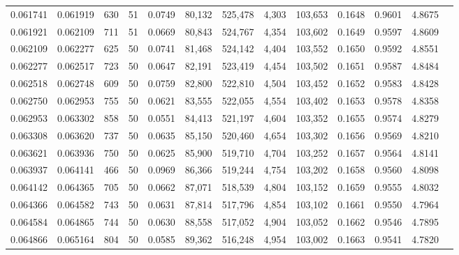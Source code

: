 \begin{tabular}{rrrrrrrrrrrrr}
0.061741 & 0.061919 &   630 &  51 &                                     0.0749 &  80,132 & 525,478 &   4,303 & 103,653 & 0.1648 & 0.9601 & 4.8675 \\
0.061921 & 0.062109 &   711 &  51 &                                     0.0669 &  80,843 & 524,767 &   4,354 & 103,602 & 0.1649 & 0.9597 & 4.8609 \\
0.062109 & 0.062277 &   625 &  50 &                                     0.0741 &  81,468 & 524,142 &   4,404 & 103,552 & 0.1650 & 0.9592 & 4.8551 \\
0.062277 & 0.062517 &   723 &  50 &                                     0.0647 &  82,191 & 523,419 &   4,454 & 103,502 & 0.1651 & 0.9587 & 4.8484 \\
0.062518 & 0.062748 &   609 &  50 &                                     0.0759 &  82,800 & 522,810 &   4,504 & 103,452 & 0.1652 & 0.9583 & 4.8428 \\
0.062750 & 0.062953 &   755 &  50 &                                     0.0621 &  83,555 & 522,055 &   4,554 & 103,402 & 0.1653 & 0.9578 & 4.8358 \\
0.062953 & 0.063302 &   858 &  50 &                                     0.0551 &  84,413 & 521,197 &   4,604 & 103,352 & 0.1655 & 0.9574 & 4.8279 \\
0.063308 & 0.063620 &   737 &  50 &                                     0.0635 &  85,150 & 520,460 &   4,654 & 103,302 & 0.1656 & 0.9569 & 4.8210 \\
0.063621 & 0.063936 &   750 &  50 &                                     0.0625 &  85,900 & 519,710 &   4,704 & 103,252 & 0.1657 & 0.9564 & 4.8141 \\
0.063937 & 0.064141 &   466 &  50 &                                     0.0969 &  86,366 & 519,244 &   4,754 & 103,202 & 0.1658 & 0.9560 & 4.8098 \\
0.064142 & 0.064365 &   705 &  50 &                                     0.0662 &  87,071 & 518,539 &   4,804 & 103,152 & 0.1659 & 0.9555 & 4.8032 \\
0.064366 & 0.064582 &   743 &  50 &                                     0.0631 &  87,814 & 517,796 &   4,854 & 103,102 & 0.1661 & 0.9550 & 4.7964 \\
0.064584 & 0.064865 &   744 &  50 &                                     0.0630 &  88,558 & 517,052 &   4,904 & 103,052 & 0.1662 & 0.9546 & 4.7895 \\
0.064866 & 0.065164 &   804 &  50 &                                     0.0585 &  89,362 & 516,248 &   4,954 & 103,002 & 0.1663 & 0.9541 & 4.7820 \\

\end{tabular}
